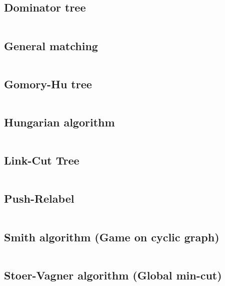 \documentclass{article}
\begin{document}
\subsection{Dominator tree}
\inputminted[mathescape, breaklines, breakafter=(, tabsize=2, frame=lines, showtabs, tab=|\ , tabcolor=lightgray]{c++}{./graphs/dominator-tree/dominator-tree.cpp}
\subsection{General matching}
\inputminted[mathescape, breaklines, breakafter=(, tabsize=2, frame=lines, showtabs, tab=|\ , tabcolor=lightgray]{c++}{./graphs/general-matching/general-matching.cpp}
\subsection{Gomory-Hu tree}
\inputminted[mathescape, breaklines, breakafter=(, tabsize=2, frame=lines, showtabs, tab=|\ , tabcolor=lightgray]{c++}{./graphs/gomory-hu/gomory-hu.cpp}
\subsection{Hungarian algorithm}
\inputminted[mathescape, breaklines, breakafter=(, tabsize=2, frame=lines, showtabs, tab=|\ , tabcolor=lightgray]{c++}{./graphs/hungarian-algorithm/hungarian-algorithm.cpp}
\subsection{Link-Cut Tree}
\inputminted[mathescape, breaklines, breakafter=(, tabsize=2, frame=lines, showtabs, tab=|\ , tabcolor=lightgray]{c++}{./graphs/link-cut-tree/link-cut-tree.cpp}
\subsection{Push-Relabel}
\inputminted[mathescape, breaklines, breakafter=(, tabsize=2, frame=lines, showtabs, tab=|\ , tabcolor=lightgray]{c++}{./graphs/push-relabel/push-relabel.cpp}
\subsection{Smith algorithm (Game on cyclic graph)}
\inputminted[mathescape, breaklines, breakafter=(, tabsize=2, frame=lines, showtabs, tab=|\ , tabcolor=lightgray]{c++}{./graphs/smith/smith.cpp}
\subsection{Stoer-Vagner algorithm (Global min-cut)}
\inputminted[mathescape, breaklines, breakafter=(, tabsize=2, frame=lines, showtabs, tab=|\ , tabcolor=lightgray]{c++}{./graphs/stoer-vagner/stoer-vagner.cpp}
\end{document}

